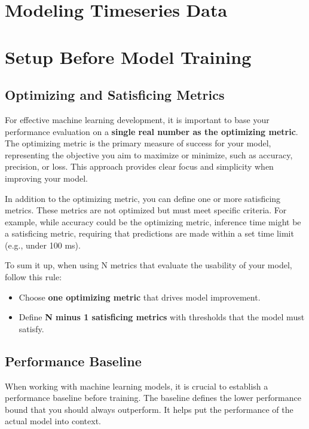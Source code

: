 \documentclass[12pt,openany]{book}
\begin{document}
\chapter{Modeling Timeseries Data}





\chapter{Setup Before Model Training}

\section{Optimizing and Satisficing Metrics}

For effective machine learning development, it is important to base your performance evaluation on a \textbf{single real number as the optimizing metric}. The optimizing metric is the primary measure of success for your model, representing the objective you aim to maximize or minimize, such as accuracy, precision, or loss. This approach provides clear focus and simplicity when improving your model. \newline

In addition to the optimizing metric, you can define one or more satisficing metrics. These metrics are not optimized but must meet specific criteria. For example, while accuracy could be the optimizing metric, inference time might be a satisficing metric, requiring that predictions are made within a set time limit (e.g., under 100 ms). \newline \newline

To sum it up, when using N metrics that evaluate the usability of your model, follow this rule:
\begin{itemize}
    \item Choose \textbf{one optimizing metric} that drives model improvement.
    \item Define \textbf{N minus 1 satisficing metrics} with thresholds that the model must satisfy.
\end{itemize}


\section{Performance Baseline} \label{sec:performance_baseline}

When working with machine learning models, it is crucial to establish a performance baseline before training. The baseline defines the lower performance bound that you should always outperform. It helps put the performance of the actual model into context. \newline
\end{document}
